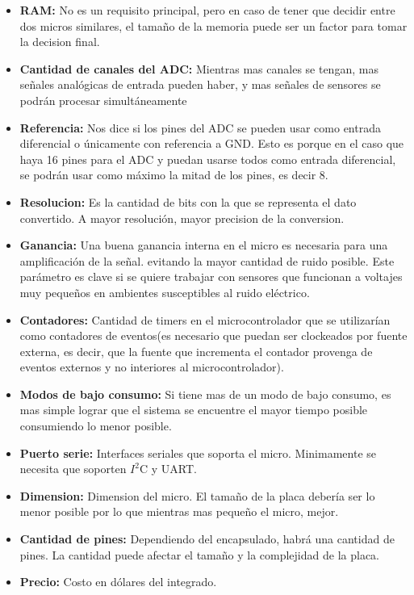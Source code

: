 \documentclass{article}
\theoremstyle{definition}
\theoremstyle{remark}
\begin{document}
\begin{itemize}
  \item \textbf{RAM:} No es un requisito principal, pero en caso de tener que decidir entre dos micros similares, el tamaño de la memoria puede ser un factor para tomar la decision final.
  \item \textbf{Cantidad de canales del ADC:} Mientras mas canales se tengan, mas señales analógicas de entrada pueden haber, y mas señales de sensores se podrán procesar simultáneamente
  \item \textbf{Referencia:} Nos dice si los pines del ADC se pueden usar como entrada diferencial o únicamente con referencia a GND. Esto es porque en el caso que haya 16 pines para el ADC y puedan usarse todos como entrada diferencial, se podrán usar como máximo la mitad de los pines, es decir 8.
  \item \textbf{Resolucion:} Es la cantidad de bits con la que se representa el dato convertido. A mayor resolución, mayor precision de la conversion.
  \item \textbf{Ganancia:} Una buena ganancia interna en el micro es necesaria para una amplificación de la señal.  evitando la mayor cantidad de ruido posible. Este parámetro es clave si se quiere trabajar con sensores que funcionan a voltajes muy pequeños en ambientes susceptibles al ruido eléctrico.
  \item \textbf{Contadores:} Cantidad de timers en el microcontrolador que se utilizarían como contadores de eventos(es necesario que puedan ser clockeados por fuente externa, es decir, que la fuente que incrementa el contador provenga de eventos externos y no interiores al microcontrolador).
  \item \textbf{Modos de bajo consumo:} Si tiene mas de un modo de bajo consumo, es mas simple lograr que el sistema se encuentre el mayor tiempo posible consumiendo lo menor posible.
  \item \textbf{Puerto serie:} Interfaces seriales que soporta el micro. Minimamente se necesita que soporten $I^{2}$C y UART.
  \item \textbf{Dimension:} Dimension del micro. El tamaño de la placa debería ser lo menor posible por lo que mientras mas pequeño el micro, mejor.
  \item \textbf{Cantidad de pines:} Dependiendo del encapsulado, habrá una cantidad de pines. La cantidad puede afectar el tamaño y la complejidad de la placa.
  \item \textbf{Precio:} Costo en dólares del integrado.
\end{itemize}
\end{document}
